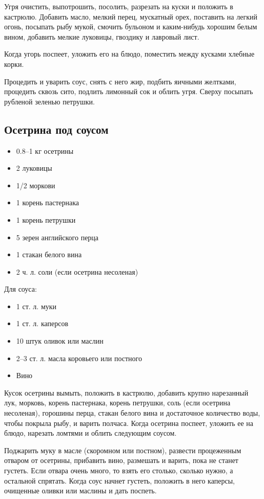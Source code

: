 Угря очистить, выпотрошить, посолить, разрезать на куски и положить в кастрюлю. Добавить масло, мелкий перец, мускатный орех, поставить на легкий огонь, посыпать рыбу мукой, смочить бульоном и каким-нибудь хорошим белым вином, добавить мелкие луковицы, гвоздику и лавровый лист.

Когда угорь поспеет, уложить его на блюдо, поместить между кусками хлебные корки.

Процедить и уварить соус, снять с него жир, подбить яичными желтками, процедить сквозь сито, подлить лимонный сок и облить угря. Сверху посыпать рубленой зеленью петрушки.

\subsection{Осетрина под соусом}

\begin{itemize}
	\item 0.8–1 кг осетрины
    \item 2 луковицы
    \item 1/2 моркови
    \item 1 корень пастернака
    \item 1 корень петрушки
    \item 5 зерен английского перца 
    \item 1 стакан белого вина
    \item 2 ч. л. соли (если осетрина несоленая)
\end{itemize}

Для соуса: 

\begin{itemize}
	\item 1 ст. л. муки 
    \item 1 ст. л. каперсов 
    \item 10 штук оливок или маслин
    \item 2–3 ст. л. масла коровьего или постного 
    \item Вино
\end{itemize}

Кусок осетрины вымыть, положить в кастрюлю, добавить крупно нарезанный лук, морковь, корень пастернака, корень петрушки, соль (если осетрина несоленая), горошины перца, стакан белого вина и достаточное количество воды, чтобы покрыла рыбу, и варить полчаса. Когда осетрина поспеет, уложить ее на блюдо, нарезать ломтями и облить следующим соусом.

Поджарить муку в масле (скоромном или постном), развести процеженным отваром от осетрины, прибавить вино, размешать и варить, пока не станет густеть. Если отвара очень много, то взять его столько, сколько нужно, а остальной спрятать. Когда соус начнет густеть, положить в него каперсы, очищенные оливки или маслины и дать поспеть.

